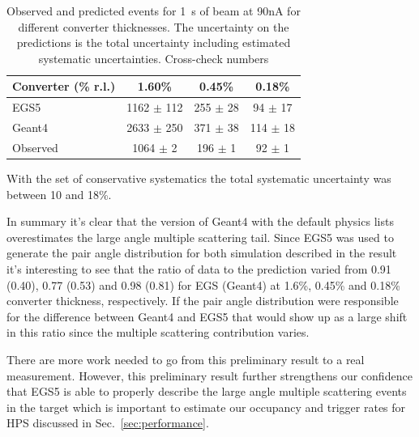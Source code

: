 \begin{table}
\begin{tabular}{|l|c|c|c|}
Converter (\% r.l.) & 1.60\% & 0.45\% &	0.18\% \\
\hline
{\sc EGS5} &	1162 $\pm$ 112 &	255 $\pm$ 28 &	94 $\pm$ 17	\\
\hline
{\sc Geant4} & 2633 $\pm$ 250 & 	371 $\pm$ 38 &	114 $\pm$ 18 \\
\hline
Observed 	& 1064 $\pm$ 2 & 196 $\pm$ 1 &	92 $\pm$ 1 \\						
%						
\hline
\end{tabular}
\caption{ {\small Observed and predicted events for 1~s of beam at 90nA for different converter 
thicknesses. The uncertainty on the predictions is the total uncertainty including estimated 
systematic uncertainties. }{\color{red} Cross-check numbers}}
\end{table}
With the set of conservative systematics the total systematic uncertainty was 
between 10 and 18\%. 

In summary it's clear that the version of  
{\sc Geant4} with the default physics lists overestimates the large angle multiple scattering tail. 
Since {\sc EGS5} was used to generate the pair 
angle distribution for both simulation described in the result it's interesting to see that the 
ratio of data to the prediction varied from 0.91 (0.40), 0.77 (0.53) and 0.98 (0.81) for {\sc EGS} 
({\sc Geant4}) at 1.6\%, 0.45\% and 0.18\% converter thickness, respectively. If the pair angle 
distribution were responsible for the difference between {\sc Geant4}  and {\sc EGS5} that would show up as a large shift in this ratio since the multiple scattering contribution varies. 

There are more work needed to go from this preliminary result to a real 
measurement. However, this preliminary result further strengthens our confidence that 
{\sc EGS5} is able to properly describe the large angle multiple scattering events in the target 
which is important to estimate our occupancy and trigger rates for HPS discussed in Sec.~\ref{sec:performance}.

